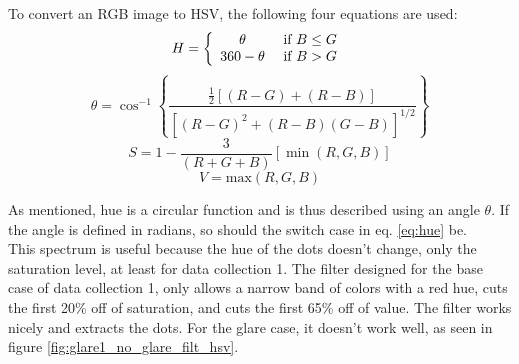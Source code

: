 To convert an RGB image to HSV, the following four equations are used:
\begin{equation}
    H=\left\{\begin{array}{cc}
\theta & \text { if } B \leq G \\
360-\theta & \text { if } B>G
\end{array}\right. \\
\label{eq:hue}
\end{equation}
\begin{equation}
\theta=\cos ^{-1}\left\{\frac{\frac{1}{2}[(R-G)+(R-B)]}{\left[(R-G)^{2}+(R-B)(G-B)\right]^{1 / 2}}\right\}
\end{equation}
\begin{equation}
S=1-\frac{3}{(R+G+B)}[\min (R, G, B)]
\end{equation}
\begin{equation}
    V = \text{max} \left(R,G,B \right)
\end{equation}



As mentioned, hue is a circular function and is thus described using an angle $\theta$. If the angle is defined in radians, so should the switch case in eq. \ref{eq:hue} be. \\


This spectrum is useful because the hue of the dots doesn't change, only the saturation level, at least for data collection 1. 
The filter designed for the base case of data collection 1, only allows a narrow band of colors with a red hue, cuts the first 20\% off of saturation, and cuts the first 65\% off of value. The filter works nicely and extracts the dots. For the glare case, it doesn't work well, as seen in figure \ref{fig:glare1_no_glare_filt_hsv}. \\

